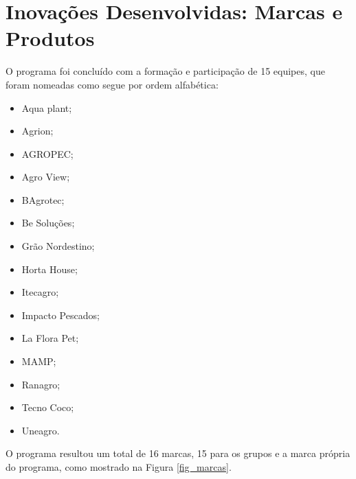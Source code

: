 \section{Inovações Desenvolvidas: Marcas e Produtos}
\label{inovacoes}

O programa foi concluído  com a formação e participação de 15 equipes, que foram nomeadas como segue por ordem alfabética: 

\begin{multicols}{3}
\centering
    \begin{itemize}
\item { Aqua plant;}
\item { Agrion;}
\item { AGROPEC;}
\item { Agro View;}
\item { BAgrotec;}
\item { Be Soluções;}
\item { Grão Nordestino;}
\item { Horta House;}
\item { Itecagro;}
\item { Impacto Pescados;}
\item { La Flora Pet;}
\item { MAMP;}
\item { Ranagro;}
\item { Tecno Coco;}
\item { Uneagro.}
\end{itemize}
\end{multicols}


O programa resultou um total de 16 marcas, 15 para os grupos e a marca própria do programa, como mostrado na Figura \ref{fig_marcas}.

